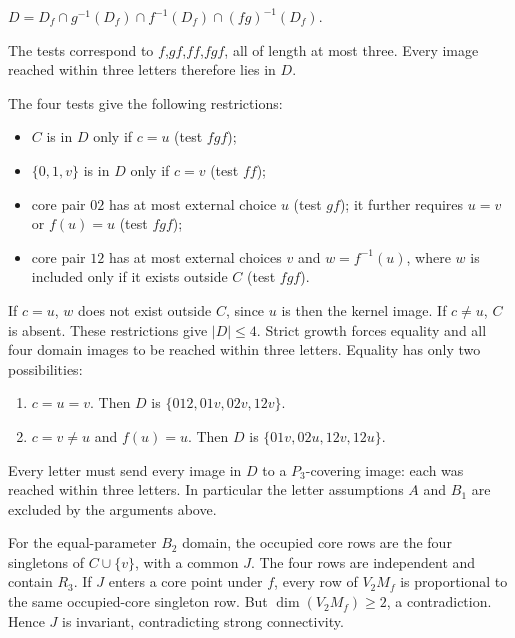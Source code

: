 \documentclass[11pt]{article}
\theoremstyle{definition}
\theoremstyle{plain}
\begin{document}
\(D=D_f\cap g^{-1}(D_f)\cap f^{-1}(D_f)\cap(fg)^{-1}(D_f).\)

The tests correspond to \(f\),\(gf\),\(ff\),\(fgf\), all of length at most three.
Every image reached within three letters therefore lies in \(D\).

The four tests give the following restrictions:

\begin{itemize}
\item
  \(C\) is in \(D\) only if \(c=u\) (test \(fgf\));
\item
  \(\{0,1,v\}\) is in \(D\) only if \(c=v\) (test \(ff\));
\item
  core pair \(02\) has at most external choice \(u\) (test \(gf\)); it further
  requires \(u=v\) or \(f(u)=u\) (test \(fgf\));
\item
  core pair \(12\) has at most external choices \(v\) and
  \(w=f^{-1}(u)\), where \(w\) is included only if it exists
  outside \(C\) (test \(fgf\)).
\end{itemize}

If \(c=u\), \(w\) does not exist outside \(C\), since \(u\) is then the
kernel image. If \(c\ne u\), \(C\) is absent. These restrictions give
\(|D|\le 4\). Strict growth forces equality and all four domain images
to be reached within three letters. Equality has only two possibilities:

\begin{enumerate}
\item
  \(c=u=v\). Then \(D\) is \(\{012,01v,02v,12v\}\).
\item
  \(c=v\ne u\) and \(f(u)=u\). Then \(D\) is
  \(\{01v,02u,12v,12u\}\).
\end{enumerate}

Every letter must send every image in \(D\) to a \(P_{3}\)-covering
image: each was reached within three letters. In particular the letter
assumptions \(A\) and \(B_{1}\) are excluded by the arguments
above.

For the equal-parameter \(B_{2}\) domain, the occupied core rows are the
four singletons of \(C\cup\{v\}\), with a common \(J\). The four
rows are independent and contain \(R_3\). If \(J\) enters a core
point under \(f\), every row of \(V_2M_f\) is proportional to the same
occupied-core singleton row. But \(\dim(V_2M_f)\ge2\), a
contradiction. Hence \(J\) is invariant, contradicting strong
connectivity.
\end{document}
